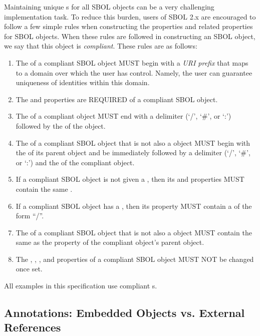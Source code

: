 Maintaining unique  s for all SBOL objects can be a very challenging implementation task.  To reduce this burden, users of SBOL 2.x are encouraged to follow a few simple rules when constructing the  properties and related properties for SBOL objects.  When these rules are followed in constructing an SBOL object, we say that this object is \emph{compliant}. These rules are as follows:
\begin{enumerate}
\item The  of a compliant SBOL object MUST begin with a \emph{URI prefix} that maps to a domain over which the user has control. Namely, the user can guarantee uniqueness of identities within this domain.
\item The  and  properties are REQUIRED of a compliant SBOL object.
\item The  of a compliant  object MUST end with a delimiter (`/', `\#', or `:') followed by the  of the object. 
\item The  of a compliant SBOL object that is not also a  object MUST begin with the  of its parent object and be immediately followed by a delimiter (`/', `\#', or `:') and the  of the compliant object.
\item If a compliant SBOL object is not given a , then its  and  properties MUST contain the same .
\item If a compliant SBOL object has a , then its  property MUST contain a  of the form  ``/''.
\item The  of a compliant SBOL object that is not also a  object MUST contain the same  as the  property of the compliant object's parent object.
\item The , , , and  properties of a compliant SBOL object MUST NOT be changed once set.
\end{enumerate}

All examples in this specification use compliant s.

\subsection{Annotations: Embedded Objects vs. External References}

